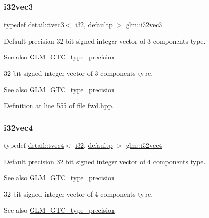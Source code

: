 \subsubsection{\texorpdfstring{i32vec3}{i32vec3}}
{\footnotesize\ttfamily typedef \hyperlink{structglm_1_1detail_1_1tvec3}{detail\+::tvec3}$<$ \hyperlink{group__gtc__type__precision_ga1d8ed5c43e91ea7d4528389da4fa9524}{i32}, \hyperlink{namespaceglm_a0f04f086094c747d227af4425893f545a9d21ccd8b5a009ec7eb7677befc3bf51}{defaultp} $>$ \hyperlink{group__gtc__type__precision_ga79a21b299190b6fee673087376753db0}{glm\+::i32vec3}}

Default precision 32 bit signed integer vector of 3 components type. \begin{DoxySeeAlso}{See also}
\hyperlink{group__gtc__type__precision}{G\+L\+M\+\_\+\+G\+T\+C\+\_\+type\+\_\+precision}
\end{DoxySeeAlso}
32 bit signed integer vector of 3 components type. \begin{DoxySeeAlso}{See also}
\hyperlink{group__gtc__type__precision}{G\+L\+M\+\_\+\+G\+T\+C\+\_\+type\+\_\+precision} 
\end{DoxySeeAlso}


Definition at line 555 of file fwd.\+hpp.

\mbox{\label{group__gtc__type__precision_ga5fea6ade2c848bca1fa55636e75a10b9}} 
\subsubsection{\texorpdfstring{i32vec4}{i32vec4}}
{\footnotesize\ttfamily typedef \hyperlink{structglm_1_1detail_1_1tvec4}{detail\+::tvec4}$<$ \hyperlink{group__gtc__type__precision_ga1d8ed5c43e91ea7d4528389da4fa9524}{i32}, \hyperlink{namespaceglm_a0f04f086094c747d227af4425893f545a9d21ccd8b5a009ec7eb7677befc3bf51}{defaultp} $>$ \hyperlink{group__gtc__type__precision_ga5fea6ade2c848bca1fa55636e75a10b9}{glm\+::i32vec4}}

Default precision 32 bit signed integer vector of 4 components type. \begin{DoxySeeAlso}{See also}
\hyperlink{group__gtc__type__precision}{G\+L\+M\+\_\+\+G\+T\+C\+\_\+type\+\_\+precision}
\end{DoxySeeAlso}
32 bit signed integer vector of 4 components type. \begin{DoxySeeAlso}{See also}
\hyperlink{group__gtc__type__precision}{G\+L\+M\+\_\+\+G\+T\+C\+\_\+type\+\_\+precision} 
\end{DoxySeeAlso}


